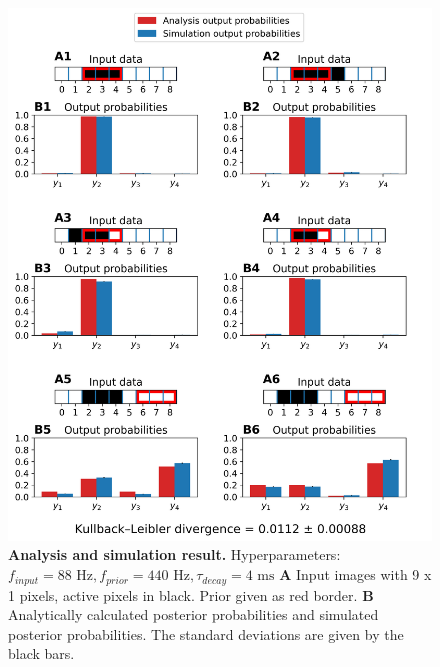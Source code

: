 \begin{figure}
  \includegraphics[width=\linewidth]{figures/1D/1D_88_440_4.png}
       \caption{\textbf{Analysis and simulation result. } Hyperparameters: $f_{input} = 88\text{ Hz}, f_{prior} = 440\text{ Hz}, \tau_{decay} = 4\text{ ms}$ \textbf{A} Input images with 9 x 1 pixels, active pixels in black. Prior given as red border. \textbf{B} Analytically calculated posterior probabilities and simulated posterior probabilities. The standard deviations are given by the black bars.}
  \label{fig:1D_88_440_4}
\end{figure}

